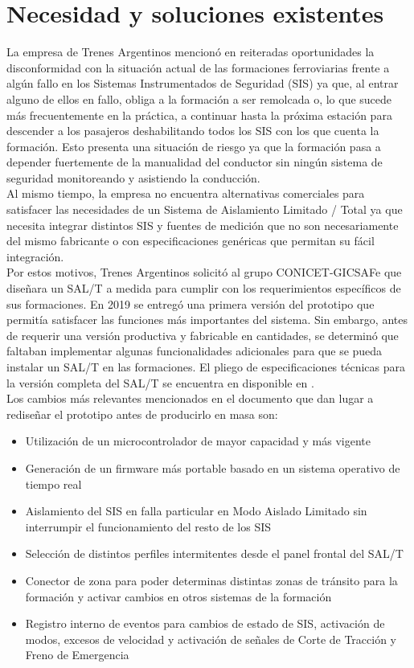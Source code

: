 \section{Necesidad y soluciones existentes}

La empresa de Trenes Argentinos mencionó en reiteradas oportunidades la disconformidad con la situación actual de las formaciones ferroviarias frente a algún fallo en los Sistemas Instrumentados de Seguridad (SIS) ya que, al entrar alguno de ellos en fallo, obliga a la formación a ser remolcada o, lo que sucede más frecuentemente en la práctica, a continuar hasta la próxima estación para descender a los pasajeros deshabilitando todos los SIS con los que cuenta la formación. Esto presenta una situación de riesgo ya que la formación pasa a depender fuertemente de la manualidad del conductor sin ningún sistema de seguridad monitoreando y asistiendo la conducción. \\

Al mismo tiempo, la empresa no encuentra alternativas comerciales para satisfacer las necesidades de un Sistema de Aislamiento Limitado / Total ya que necesita integrar distintos SIS y fuentes de medición que no son necesariamente del mismo fabricante o con especificaciones genéricas que permitan su fácil integración.  \\

Por estos motivos, Trenes Argentinos solicitó al grupo CONICET-GICSAFe que diseñara un SAL/T a medida para cumplir con los requerimientos específicos de sus formaciones. En 2019 se entregó una primera versión del prototipo que permitía satisfacer las funciones más importantes del sistema. Sin embargo, antes de requerir una versión productiva y fabricable en cantidades, se determinó que faltaban implementar algunas funcionalidades adicionales para que se pueda instalar un SAL/T en las formaciones. El pliego de especificaciones técnicas para la versión completa del SAL/T se encuentra en disponible en \cite{spec}. \\

Los cambios más relevantes mencionados en el documento que dan lugar a rediseñar el prototipo antes de producirlo en masa son: 
\begin{itemize}
    \item Utilización de un microcontrolador de mayor capacidad y más vigente
    \item Generación de un firmware más portable basado en un sistema operativo de tiempo real
    \item Aislamiento del SIS en falla particular en Modo Aislado Limitado sin interrumpir el funcionamiento del resto de los SIS
    \item Selección de distintos perfiles intermitentes desde el panel frontal del SAL/T
    \item Conector de zona para poder determinas distintas zonas de tránsito para la formación y activar cambios en otros sistemas de la formación
    \item Registro interno de eventos para cambios de estado de SIS, activación de modos, excesos de velocidad y activación de señales de Corte de Tracción y Freno de Emergencia
\end{itemize}
